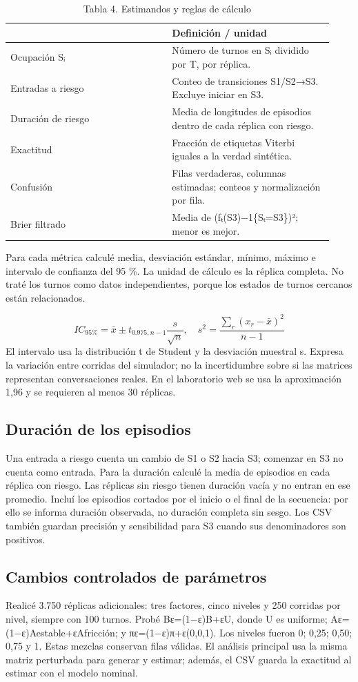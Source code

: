 \documentclass[10pt,a4paper]{article}
\begin{document}
{\small\begin{longtable}{p{0.465\linewidth}p{0.465\linewidth}}\caption{Tabla 4. Estimandos y reglas de cálculo}\\ & Definición / unidad\\\midrule\endfirsthead
Ocupación Sᵢ & Número de turnos en Sᵢ dividido por T, por réplica.\\
Entradas a riesgo & Conteo de transiciones S1/S2→S3. Excluye iniciar en S3.\\
Duración de riesgo & Media de longitudes de episodios dentro de cada réplica con riesgo.\\
Exactitud & Fracción de etiquetas Viterbi iguales a la verdad sintética.\\
Confusión & Filas verdaderas, columnas estimadas; conteos y normalización por fila.\\
Brier filtrado & Media de (fₜ(S3)−1\{Sₜ=S3\})²; menor es mejor.\\
\bottomrule\end{longtable}}
Para cada métrica calculé media, desviación estándar, mínimo, máximo e intervalo de confianza del 95 \%. La unidad de cálculo es la réplica completa. No traté los turnos como datos independientes, porque los estados de turnos cercanos están relacionados.


\[IC_{95\%}=\bar{x}\pm t_{0.975,n-1}\frac{s}{\sqrt{n}},\quad s^2=\frac{\sum_r(x_r-\bar{x})^2}{n-1}\]
El intervalo usa la distribución t de Student y la desviación muestral s. Expresa la variación entre corridas del simulador; no la incertidumbre sobre si las matrices representan conversaciones reales. En el laboratorio web se usa la aproximación 1,96 y se requieren al menos 30 réplicas.


\subsection*{Duración de los episodios}
Una entrada a riesgo cuenta un cambio de S1 o S2 hacia S3; comenzar en S3 no cuenta como entrada. Para la duración calculé la media de episodios en cada réplica con riesgo. Las réplicas sin riesgo tienen duración vacía y no entran en ese promedio. Incluí los episodios cortados por el inicio o el final de la secuencia: por ello se informa duración observada, no duración completa sin sesgo. Los CSV también guardan precisión y sensibilidad para S3 cuando sus denominadores son positivos.


\subsection*{Cambios controlados de parámetros}
Realicé 3.750 réplicas adicionales: tres factores, cinco niveles y 250 corridas por nivel, siempre con 100 turnos. Probé Bε=(1−ε)B+εU, donde U es uniforme; Aε=(1−ε)Aestable+εAfricción; y πε=(1−ε)π+ε(0,0,1). Los niveles fueron 0; 0,25; 0,50; 0,75 y 1. Estas mezclas conservan filas válidas. El análisis principal usa la misma matriz perturbada para generar y estimar; además, el CSV guarda la exactitud al estimar con el modelo nominal.
\end{document}
